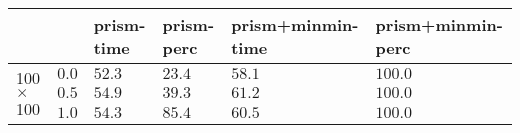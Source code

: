 \begin{tabular}{llllll}
\toprule
 &  & prism-time & prism-perc & prism+minmin-time & prism+minmin-perc \\
\midrule
\multirow[t]{3}{*}{100$\times$100} & $0.0$ & $52.3$ & $23.4$ & $58.1$ & $100.0$ \\
 & $0.5$ & $54.9$ & $39.3$ & $61.2$ & $100.0$ \\
 & $1.0$ & $54.3$ & $85.4$ & $60.5$ & $100.0$ \\
\cline{1-6}
\bottomrule
\end{tabular}
